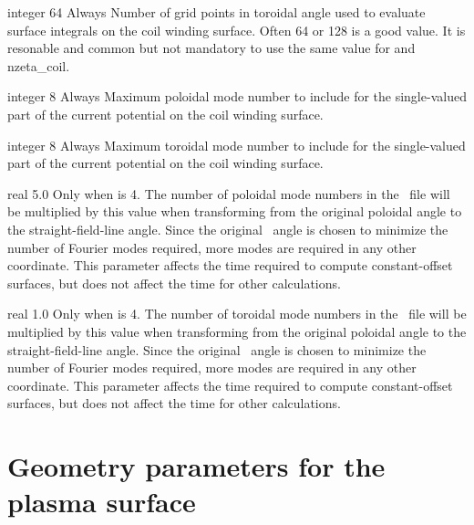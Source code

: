 \myhrule

{integer}
{64}
{Always}
{Number of grid points in toroidal angle used to evaluate surface integrals on the coil winding surface.
Often 64 or 128 is a good value.
It is resonable and common but not mandatory to use the same value for  and {\ttfamily nzeta\_coil}.}

\myhrule

{integer}
{8}
{Always}
{Maximum poloidal mode number to include for the single-valued part of the current potential on the coil winding surface.
}

\myhrule

{integer}
{8}
{Always}
{
Maximum toroidal mode number to include for the single-valued part of the current potential on the coil winding surface.
}

\myhrule

{real}
{5.0}
{Only when  is 4.}
{The number of poloidal mode numbers in the \vmec~file will be multiplied by this value
when transforming from the original poloidal angle to the straight-field-line angle.
Since the original \vmec~angle is chosen to minimize the number of Fourier modes required,
more modes are required in any other coordinate.
This parameter affects the time required to compute constant-offset surfaces,
but does not affect the time for other calculations.
}

\myhrule

{real}
{1.0}
{Only when  is 4.}
{The number of toroidal mode numbers in the \vmec~file will be multiplied by this value
when transforming from the original poloidal angle to the straight-field-line angle.
Since the original \vmec~angle is chosen to minimize the number of Fourier modes required,
more modes are required in any other coordinate.
This parameter affects the time required to compute constant-offset surfaces,
but does not affect the time for other calculations.
}

\section{Geometry parameters for the plasma surface}


